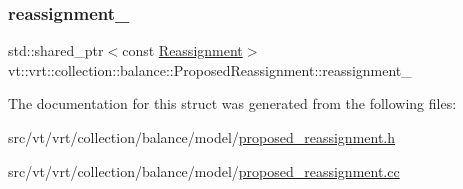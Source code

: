 \subsubsection{\texorpdfstring{reassignment\+\_\+}{reassignment\_}}
{\footnotesize\ttfamily std\+::shared\+\_\+ptr$<$const \hyperlink{structvt_1_1vrt_1_1collection_1_1balance_1_1_reassignment}{Reassignment}$>$ vt\+::vrt\+::collection\+::balance\+::\+Proposed\+Reassignment\+::reassignment\+\_\+\hspace{0.3cm}{\ttfamily [private]}}



The documentation for this struct was generated from the following files\+:\begin{DoxyCompactItemize}
\item 
src/vt/vrt/collection/balance/model/\hyperlink{proposed__reassignment_8h}{proposed\+\_\+reassignment.\+h}\item 
src/vt/vrt/collection/balance/model/\hyperlink{proposed__reassignment_8cc}{proposed\+\_\+reassignment.\+cc}\end{DoxyCompactItemize}
